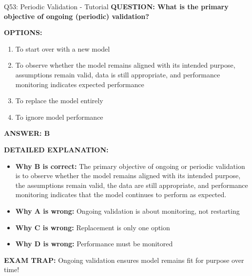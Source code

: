 \documentclass[8pt]{beamer}
\begin{document}
	\begin{frame}{Q53: Periodic Validation - Tutorial}
		\fontsize{6.5}{7.5}\selectfont
		\textbf{QUESTION: What is the primary objective of ongoing (periodic) validation?}
		
		\vspace{0.1cm}
		\textbf{OPTIONS:}
		\begin{enumerate}
			\item To start over with a new model
			\item To observe whether the model remains aligned with its intended purpose, assumptions remain valid, data is still appropriate, and performance monitoring indicates expected performance
			\item To replace the model entirely
			\item To ignore model performance
		\end{enumerate}
		
		\vspace{0.1cm}
		\textcolor{myblue}{\textbf{ANSWER: B}}
		
		\vspace{0.1cm}
		\textbf{DETAILED EXPLANATION:}
		\begin{itemize}
			\item \textbf{Why B is correct:} The primary objective of ongoing or periodic validation is to observe whether the model remains aligned with its intended purpose, the assumptions remain valid, the data are still appropriate, and performance monitoring indicates that the model continues to perform as expected.
			\item \textbf{Why A is wrong:} Ongoing validation is about monitoring, not restarting
			\item \textbf{Why C is wrong:} Replacement is only one option
			\item \textbf{Why D is wrong:} Performance must be monitored
		\end{itemize}
		
		\textcolor{myred}{\textbf{EXAM TRAP:}} Ongoing validation ensures \textcolor{myblue}{model remains fit for purpose over time}!
	\end{frame}
	
\end{document}
